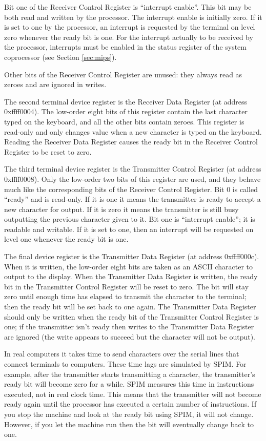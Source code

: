 \documentclass[11pt]{article}
\begin{document}
Bit one of the Receiver Control Register is ``interrupt enable''.
This bit may be both read and written by the processor.  The interrupt
enable is initially zero.  If it is set to one by the processor, an
interrupt is requested by the terminal on level zero whenever the
ready bit is one.  For the interrupt actually to be received by the
processor, interrupts must be enabled in the status register of the
system coprocessor (see Section \ref{sec:mips}).

Other bits of the Receiver Control Register are unused: they always
read as zeroes and are ignored in writes.

The second terminal device register is the Receiver Data Register (at
address 0xffff0004).  The low-order eight bits of this register
contain the last character typed on the keyboard, and all the other
bits contain zeroes.  This register is read-only and only changes
value when a new character is typed on the keyboard.  Reading the
Receiver Data Register causes the ready bit in the Receiver Control
Register to be reset to zero.

The third terminal device register is the Transmitter Control Register
(at address 0xffff0008).  Only the low-order two bits of this register
are used, and they behave much like the corresponding bits of the
Receiver Control Register.  Bit 0 is called ``ready'' and is
read-only.  If it is one it means the transmitter is ready to accept a
new character for output.  If it is zero it means the transmitter is
still busy outputting the previous character given to it.  Bit one is
``interrupt enable''; it is readable and writable.  If it is set to
one, then an interrupt will be requested on level one whenever the
ready bit is one.

The final device register is the Transmitter Data Register (at address
0xffff000c).  When it is written, the low-order eight bits are taken
as an ASCII character to output to the display.  When the Transmitter
Data Register is written, the ready bit in the Transmitter Control
Register will be reset to zero.  The bit will stay zero until enough
time has elapsed to transmit the character to the terminal; then the
ready bit will be set back to one again.  The Transmitter Data
Register should only be written when the ready bit of the Transmitter
Control Register is one; if the transmitter isn't ready then writes to
the Transmitter Data Register are ignored (the write appears to
succeed but the character will not be output).

In real computers it takes time to send characters over the serial
lines that connect terminals to computers.  These time lags are
simulated by SPIM.  For example, after the transmitter starts
transmitting a character, the transmitter's ready bit will become zero
for a while.  SPIM measures this time in instructions executed, not in
real clock time.  This means that the transmitter will not become
ready again until the processor has executed a certain number of
instructions.  If you stop the machine and look at the ready bit using
SPIM, it will not change.  However, if you let the machine run then
the bit will eventually change back to one.
\end{document}
